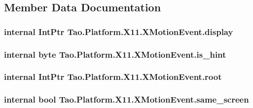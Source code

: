\subsection{Member Data Documentation}
\hypertarget{struct_tao_1_1_platform_1_1_x11_1_1_x_motion_event_af0804991b2898ab556323c117eda551b}{
\subsubsection[{display}]{\setlength{\rightskip}{0pt plus 5cm}internal IntPtr {\bf Tao.Platform.X11.XMotionEvent.display}}}
\label{struct_tao_1_1_platform_1_1_x11_1_1_x_motion_event_af0804991b2898ab556323c117eda551b}
\hypertarget{struct_tao_1_1_platform_1_1_x11_1_1_x_motion_event_a43c7fdd214b4939e904565fe9cd92380}{
\subsubsection[{is\_\-hint}]{\setlength{\rightskip}{0pt plus 5cm}internal byte {\bf Tao.Platform.X11.XMotionEvent.is\_\-hint}}}
\label{struct_tao_1_1_platform_1_1_x11_1_1_x_motion_event_a43c7fdd214b4939e904565fe9cd92380}
\hypertarget{struct_tao_1_1_platform_1_1_x11_1_1_x_motion_event_a4cd158f9a53b85239b7b35f18f14e703}{
\subsubsection[{root}]{\setlength{\rightskip}{0pt plus 5cm}internal IntPtr {\bf Tao.Platform.X11.XMotionEvent.root}}}
\label{struct_tao_1_1_platform_1_1_x11_1_1_x_motion_event_a4cd158f9a53b85239b7b35f18f14e703}
\hypertarget{struct_tao_1_1_platform_1_1_x11_1_1_x_motion_event_ad9b544bcee98e1d96ea118c6934efe34}{
\subsubsection[{same\_\-screen}]{\setlength{\rightskip}{0pt plus 5cm}internal bool {\bf Tao.Platform.X11.XMotionEvent.same\_\-screen}}}
